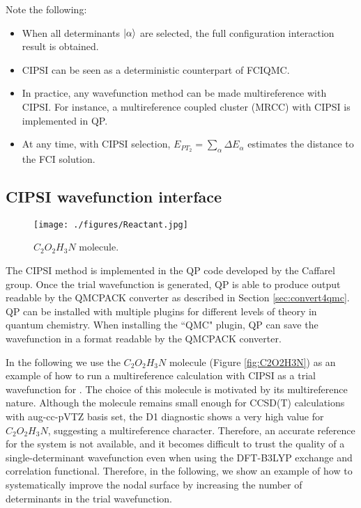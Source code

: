 Note the following:
\begin{itemize}
\item When all determinants $\lvert \alpha \rangle$ are selected, the full configuration interaction result is obtained.
\item CIPSI can be seen as a deterministic counterpart of FCIQMC. 
\item In practice, any wavefunction method can be made multireference with CIPSI. For instance, a multireference coupled cluster (MRCC) with CIPSI is implemented in QP.\cite{Garniron2017-1}
\item At any time, with CIPSI selection, $E_{PT_2}=\sum_\alpha \Delta E_\alpha$ estimates the distance to the FCI solution.
\end{itemize}


\subsection{CIPSI wavefunction interface}
\label{sec:cipsi}


\begin{figure}
\begin{center}
\texttt{[image: ./figures/Reactant.jpg]}
\end{center}
\caption{$C_2O_2H_3N$ molecule.}
\protect{\label{fig:C2O2H3N}}
\end{figure}
The CIPSI method
is implemented in the QP code\cite{QP} developed by the Caffarel group. Once the trial wavefunction is generated, QP is able to produce output readable by the QMCPACK converter as described in Section \ref{sec:convert4qmc}. QP can be installed with multiple plugins for different levels of theory in quantum chemistry. When installing the ``QMC" plugin, QP can save the wavefunction in a format readable by the QMCPACK converter. 

In the following we use the $C_2O_2H_3N$ molecule (Figure \ref{fig:C2O2H3N}) as an example of how to run a multireference calculation with CIPSI as a trial wavefunction for \qmcpack. The choice of this molecule is motivated by its multireference nature. Although the molecule remains small enough for CCSD(T) calculations with aug-cc-pVTZ basis set, the D1 diagnostic shows a very high value for  $C_2O_2H_3N$, suggesting a multireference character.  Therefore, an accurate reference for the system is not available, and it becomes difficult to trust the quality of a single-determinant wavefunction even when using the DFT-B3LYP exchange and correlation functional. Therefore, in the following, we show an example of how to systematically improve the nodal surface by increasing the number of determinants in the trial wavefunction.

